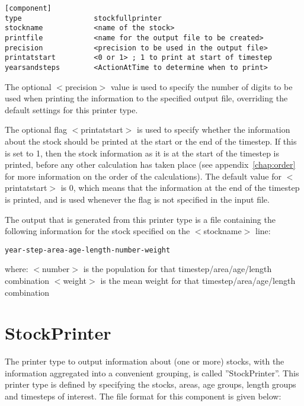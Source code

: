\documentclass[10pt,twoside]{book}
\begin{document}
{\small\begin{verbatim}
[component]
type                 stockfullprinter
stockname            <name of the stock>
printfile            <name for the output file to be created>
precision            <precision to be used in the output file>
printatstart         <0 or 1> ; 1 to print at start of timestep
yearsandsteps        <ActionAtTime to determine when to print>
\end{verbatim}}

The optional $<$precision$>$ value is used to specify the number of digits to be used when printing the information to the specified output file, overriding the default settings for this printer type.

\bigskip
The optional flag $<$printatstart$>$ is used to specify whether the information about the stock should be printed at the start or the end of the timestep.  If this is set to 1, then the stock information as it is at the start of the timestep is printed, before any other calculation has taken place (see appendix~\ref{chap:order} for more information on the order of the calculations).  The default value for $<$printatstart$>$ is 0, which means that the information at the end of the timestep is printed, and is used whenever the flag is not specified in the input file.

\bigskip
The output that is generated from this printer type is a file containing the following information for the stock specified on the $<$stockname$>$ line:

{\small\begin{verbatim}
year-step-area-age-length-number-weight
\end{verbatim}}

where:\newline
$<$number$>$ is the population for that timestep/area/age/length combination\newline
$<$weight$>$ is the mean weight for that timestep/area/age/length combination

\section{StockPrinter}\label{sec:stockprinter}
The printer type to output information about (one or more) stocks, with the information aggregated into a convenient grouping, is called ''StockPrinter''.  This printer type is defined by specifying the stocks, areas, age groups, length groups and timesteps of interest.  The file format for this component is given below:
\end{document}
